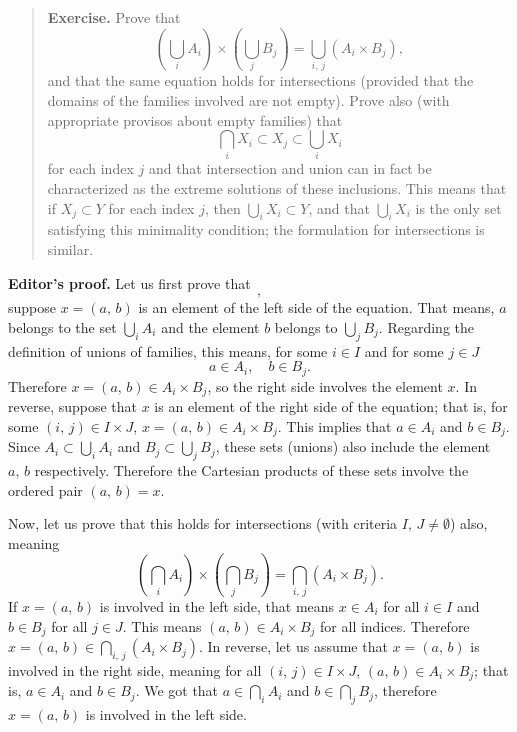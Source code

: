 \begin{quote}
	\textbf{Exercise.} Prove that
	\[
		\left( \bigcup_i A_i \right) \times \left( \bigcup_j B_j\right) = \bigcup_{i, \,j} (A_i \times B_j),
	\]
	and that the same equation holds for intersections (provided that the domains of the families involved are not empty). Prove also (with appropriate provisos about empty families) that 
	\[
		\bigcap_i X_i \subset X_j \subset \bigcup_i X_i
	\]
	for each index $j$ and that intersection and union can in fact be characterized as the extreme solutions of these inclusions. This means that if $X_j \subset Y$ for each index $j$, then $\bigcup_i X_i \subset Y$, and that $\bigcup_i X_i$ is the only set satisfying this minimality condition; the formulation for intersections is similar.
\end{quote}

\textbf{Editor's proof.} Let us first prove that
\[
,
\]
suppose $x = (a, \, b)$ is an element of the left side of the equation. That means, $a$ belongs to the set $\bigcup_i A_i$ and the element $b$ belongs to $\bigcup_j B_j$. Regarding the definition of unions of families, this means, for some $i \in I$ and for some $j \in J$
\[
	a \in A_i, \quad b \in B_j.
\]
Therefore $x = (a, \, b) \in A_i \times B_j$, so the right side involves the element $x$. In reverse, suppose that $x$ is an element of the right side of the equation; that is, for some $(i, \, j) \in I \times J$, $x = (a, \, b) \in A_i \times B_j$. This implies that $a \in A_i$ and $b \in B_j$. Since $A_i \subset \bigcup_i A_i$ and $B_j \subset \bigcup_j B_j$, these sets (unions) also include the element $a, \, b$ respectively. Therefore the Cartesian products of these sets involve the ordered pair $(a, \, b) = x$.

Now, let us prove that this holds for intersections (with criteria $I, \, J \neq \emptyset$) also, meaning
\[
\left( \bigcap_i A_i \right) \times \left( \bigcap_j B_j\right) = \bigcap_{i, \,j} (A_i \times B_j).
\]
If $x = (a, \, b)$ is involved in the left side, that means $x \in A_i$ for all $i \in I$ and $b \in B_j$ for all $j \in J$. This means $(a, \, b) \in A_i \times B_j$ for all indices. Therefore $x = (a, \, b) \in \bigcap_{i, \, j} (A_i \times B_j)$. In reverse, let us assume that $x = (a, \, b)$ is involved in the right side, meaning for all $(i, \, j) \in I \times J$, $(a, \, b) \in A_i \times B_j$; that is, $a \in A_i$ and $b \in B_j$. We got that $a \in \bigcap_i A_i$ and $b \in \bigcap_j B_j$, therefore $x = (a, \, b)$ is involved in the left side.

